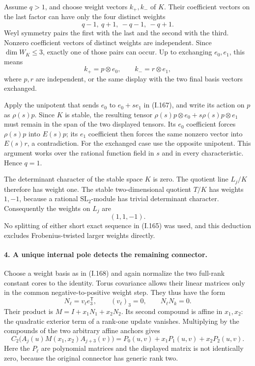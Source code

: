 Assume $q>1$, and choose weight vectors $k_+,k_-$ of $K$.
Their coefficient vectors on the last factor can have only
the four distinct weights
\[
 q-1,\ q+1,\ -q-1,\ -q+1.
 \tag{I.166}
\]
Weyl symmetry pairs the first with the last and the second
with the third. Nonzero coefficient vectors of distinct
weights are independent. Since $\dim W_K\le3$, exactly one
of those pairs can occur. Up to exchanging $e_0,e_1$, this
means
\[
 k_+=p\otimes e_0,\qquad k_-=r\otimes e_1,
 \tag{I.167}
\]
where $p,r$ are independent, or the same display with the
two final basis vectors exchanged.

Apply the unipotent that sends $e_0$ to $e_0+s e_1$ in
(I.167), and write its action on $p$ as $\rho(s)p$.
Since $K$ is stable, the resulting tensor
$\rho(s)p\otimes e_0+s\rho(s)p\otimes e_1$ must remain in
the span of the two displayed tensors. Its $e_0$ coefficient
forces $\rho(s)p$ into $E(s)p$; its $e_1$ coefficient then
forces the same nonzero vector into $E(s)r$, a contradiction.
For the exchanged case use the opposite unipotent. This
argument works over the rational function field in $s$ and
in every characteristic. Hence $q=1$.

The determinant character of the stable space $K$ is zero.
The quotient line $L_j/K$ therefore has weight one. The
stable two-dimensional quotient $T/K$ has weights $1,-1$,
because a rational $\mathrm{SL}_2$-module has trivial
determinant character. Consequently the weights on $L_j$ are
\[
 (1,1,-1).
 \tag{I.168}
\]
No splitting of either short exact sequence in (I.165) was
used, and this deduction excludes Frobenius-twisted larger
weights directly.

\paragraph{4. A unique internal pole detects the remaining connector.}
Choose a weight basis as in (I.168) and again normalize the
two full-rank constant cores to the identity. Torus covariance
allows their linear matrices only in the common
negative-to-positive weight step. They thus have the form
\[
 N_\ell=v_\ell e_3^{\mathsf T},\qquad
 (v_\ell)_3=0,\qquad N_\ell N_k=0.
 \tag{I.169}
\]
Their product is
$M=I+x_1N_1+x_2N_2$. Its second compound is affine in
$x_1,x_2$: the quadratic exterior term of a rank-one update
vanishes. Multiplying by the compounds of the two arbitrary
affine anchors gives
\[
 C_2\bigl(A_j(u)M(x_1,x_2)A_{j+3}(v)\bigr)
   =P_0(u,v)+x_1P_1(u,v)+x_2P_2(u,v).
 \tag{I.170}
\]
Here the $P_\ell$ are polynomial matrices and the displayed
matrix is not identically zero, because the original
connector has generic rank two.

